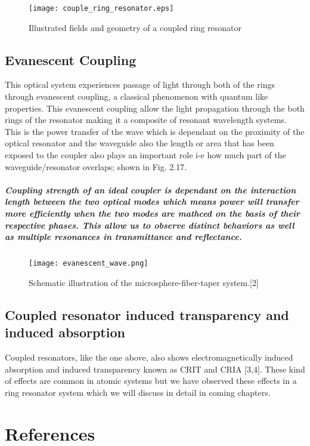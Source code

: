 \begin{figure}[t]
\centering
\texttt{[image: couple\_ring\_resonator.eps]}
\caption{Illustrated fields and geometry of a coupled ring resonator}
\end{figure}

\subsection{Evanescent Coupling}
This optical system experiences passage of light through both of the rings through evanescent coupling, a classical phenomenon with quantum like properties. This evanescent coupling allow the light propagation through the both rings of the resonator making it a composite of resonant wavelength systems. This is the power transfer of the wave which is dependant on the proximity of the optical resonator and the waveguide also the length or area that has been exposed to the coupler also plays an important role i-e how much part of the waveguide/resonator overlaps; shown in Fig. 2.17.
\subparagraph{\normalfont \large Coupling strength of an ideal coupler is dependant on the interaction length between the two optical modes which means power will transfer more efficiently when the two modes are mathced on the basis of their respective phases.  This allow us to observe distinct behaviors as well as multiple resonances in transmittance and reflectance.} 
\newpage

\begin{figure}[h]
\centering
\texttt{[image: evanescent\_wave.png]}
\caption{Schematic illustration of the microsphere-fiber-taper
system.[2]}
\end{figure}


\subsection{Coupled resonator induced transparency and induced absorption}
Coupled resonators, like the one above, also shows electromagnetically induced absorption and induced transparency known as CRIT and CRIA [3,4]. These kind of effects are common in atomic systems but we have observed these effects in a ring resonator system which we will discuss in detail in coming chapters.

\newpage
\section*{References}
